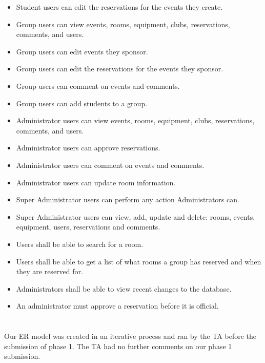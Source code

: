 \documentclass{article}
\begin{document}
\begin{itemize}
\item Student users can edit the reservations for the events they create.
\item Group users can view events, rooms, equipment, clubs, reservations, comments, and users.
\item Group users can edit events they sponsor.
\item Group users can edit the reservations for the events they sponsor.
\item Group users can comment on events and comments.
\item Group users can add students to a group.
\item Administrator users can view events, rooms, equipment, clubs, reservations, comments, and users.
\item Administrator users can approve reservations.
\item Administrator users can comment on events and comments.
\item Administrator users can update room information.
\item Super Administrator users can perform any action Administrators can.
\item Super Administrator users can view, add, update and delete: rooms, events, equipment, users, reservations and comments.
\item Users shall be able to search for a room.
\item Users shall be able to get a list of what rooms a group has
reserved and when they are reserved for.
\item Administrators shall be able to view recent changes to the database.
\item An administrator must approve a reservation before it is official.
\end{itemize}



\section{}
Our ER model was created in an iterative process and ran by the TA before
the submission of phase 1. The TA had no further comments on our phase 1
submission. 

\section{}

\end{document}
